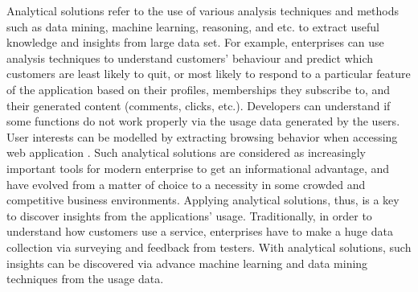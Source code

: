 Analytical solutions refer to the use of various analysis techniques and methods such as data mining, machine learning, reasoning, and etc. to extract useful knowledge and insights from large data set. For example, enterprises can use analysis techniques to understand customers' behaviour and predict which customers are least likely to quit, or most likely to respond to a particular feature of the application based on their profiles, memberships they subscribe to, and their generated content (comments, clicks, etc.). Developers can understand if some functions do not work properly via the usage data generated by the users. User interests can be modelled by extracting browsing behavior when accessing web application \cite{Gasparetti2016}. Such analytical solutions are considered as increasingly important tools for modern enterprise to get an informational advantage, and have evolved from a matter of choice to a necessity in some crowded and competitive business environments. Applying analytical solutions, thus, is a key to discover insights from the applications' usage. Traditionally, in order to understand how customers use a service, enterprises have to make a huge data collection via surveying and feedback from testers. With analytical solutions, such insights can be discovered via advance machine learning and data mining techniques from the usage data. 

